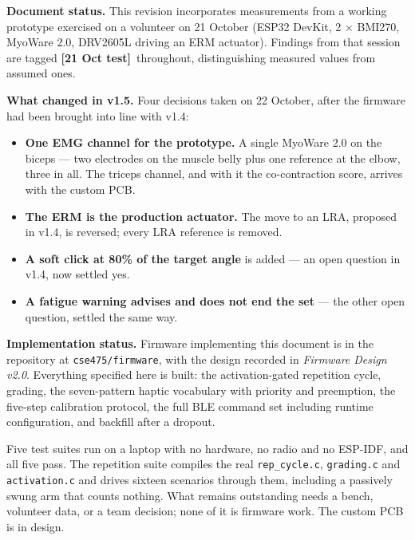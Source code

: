 \documentclass[11pt]{article}
\newcommand{\tested}{{\sffamily\scriptsize\color{good}\textbf{[21 Oct test]}}\ }
\begin{document}
\begin{callout}
\textbf{Document status.} This revision incorporates measurements from a working
prototype exercised on a volunteer on 21 October (ESP32 DevKit, 2 $\times$
BMI270, MyoWare 2.0, DRV2605L driving an ERM actuator). Findings from that
session are tagged \tested throughout, distinguishing measured values from
assumed ones.

\medskip
\textbf{What changed in v1.5.} Four decisions taken on 22 October, after the
firmware had been brought into line with v1.4:

\begin{itemize}
\item \textbf{One EMG channel for the prototype.} A single MyoWare 2.0 on the
biceps --- two electrodes on the muscle belly plus one reference at the elbow,
three in all. The triceps channel, and with it the co-contraction score,
arrives with the custom PCB.
\item \textbf{The ERM is the production actuator.} The move to an LRA,
proposed in v1.4, is reversed; every LRA reference is removed.
\item \textbf{A soft click at 80\% of the target angle} is added --- an open
question in v1.4, now settled yes.
\item \textbf{A fatigue warning advises and does not end the set} --- the
other open question, settled the same way.
\end{itemize}

\medskip
\textbf{Implementation status.} Firmware implementing this document is in the
repository at \texttt{cse475/firmware}, with the design recorded in
\emph{Firmware Design v2.0}. Everything specified here is built: the
activation-gated repetition cycle, grading, the seven-pattern haptic
vocabulary with priority and preemption, the five-step calibration protocol,
the full BLE command set including runtime configuration, and backfill after a
dropout.

\medskip
Five test suites run on a laptop with no hardware, no radio and no ESP-IDF,
and all five pass. The repetition suite compiles the real
\texttt{rep\_cycle.c}, \texttt{grading.c} and \texttt{activation.c} and
drives sixteen scenarios through them, including a passively swung arm that
counts nothing. What remains outstanding needs a bench, volunteer data, or a
team decision; none of it is firmware work. The custom PCB is in design.
\end{callout}

\end{document}
